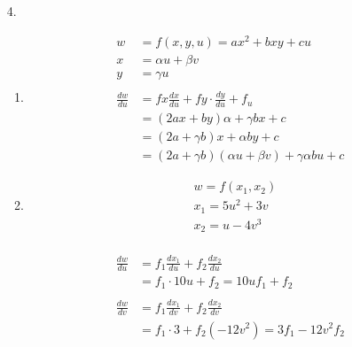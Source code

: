 \documentclass{./../../Latex/homework}
\begin{document}
\begin{enumerate}
\item[4.] \begin{enumerate}
\item
$$
\begin{aligned}
w &=f(x, y, u)=a x^{2}+b x y+c u \\
x &=\alpha u+\beta v \\
y &=\gamma u \\~\\
\frac{d w}{d u} &=f x \frac{d x}{d u}+f y \cdot \frac{d y}{d u}+f_{u} \\
&=(2 a x+b y) \alpha+\gamma b x+c \\
&=(2 a+\gamma b) x+\alpha b y+c \\
&=(2 a+\gamma b)(\alpha u+\beta v)+\gamma \alpha b u+c
\end{aligned}
$$
\item
$$
\begin{aligned}
&w=f\left(x_{1}, x_{2}\right) \\
&x_{1}=5 u^{2}+3 v \\
&x_{2}=u-4 v^{3}
\end{aligned}
$$ \\
$$
\begin{aligned}
\frac{d w}{d u} &=f_{1} \frac{d x_{1}}{d u}+f_{2} \frac{d x_{2}}{d u} \\
&=f_{1} \cdot 10 u+f_{2}=10 u f_{1}+f_{2} \\~\\
\frac{d w}{d v} &=f_{1} \frac{d x_{1}}{d v}+f_{2} \frac{d x_{2}}{d v} \\
&=f_{1} \cdot 3+f_{2}\left(-12 v^{2}\right)=3 f_{1}-12 v^{2} f_{2}
\end{aligned}
$$ \\
\end{enumerate}
\end{enumerate}
\end{document}
